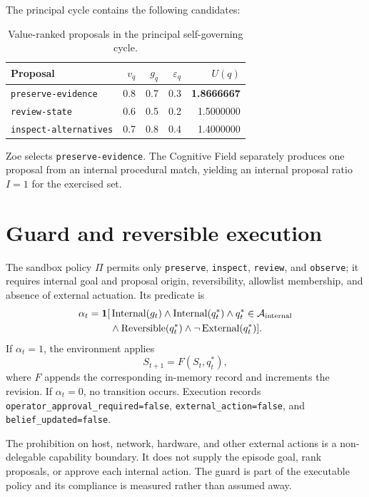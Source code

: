 The principal cycle contains the following candidates:
\begin{table}[htbp]
\centering
\caption{Value-ranked proposals in the principal self-governing cycle.}
\label{tab:proposal-values}
\begin{tabular}{lrrrr}
\toprule
Proposal&$v_q$&$g_q$&$\varepsilon_q$&$U(q)$\\
\midrule
\texttt{preserve-evidence}&0.8&0.7&0.3&\textbf{1.8666667}\\
\texttt{review-state}&0.6&0.5&0.2&1.5000000\\
\texttt{inspect-alternatives}&0.7&0.8&0.4&1.4000000\\
\bottomrule
\end{tabular}
\end{table}
Zoe selects \texttt{preserve-evidence}. The Cognitive Field separately produces one proposal from an internal procedural match, yielding an internal proposal ratio $I=1$ for the exercised set.

\section{Guard and reversible execution}
The sandbox policy $\Pi$ permits only \texttt{preserve}, \texttt{inspect}, \texttt{review}, and \texttt{observe}; it requires internal goal and proposal origin, reversibility, allowlist membership, and absence of external actuation. Its predicate is
\begin{equation}
\begin{split}
\alpha_t=\mathbf 1[&\operatorname{Internal}(g_t)
\land\operatorname{Internal}(q_t^*)
\land q_t^*\in\mathcal A_{\mathrm{internal}}\\
&\land\operatorname{Reversible}(q_t^*)
\land\neg\operatorname{External}(q_t^*)].
\end{split}
\label{eq:guard}
\end{equation}
If $\alpha_t=1$, the environment applies
\begin{equation}
S_{t+1}=F(S_t,q_t^*),
\end{equation}
where $F$ appends the corresponding in-memory record and increments the revision. If $\alpha_t=0$, no transition occurs. Execution records \texttt{operator\_approval\_required=false}, \texttt{external\_action=false}, and \texttt{belief\_updated=false}.

The prohibition on host, network, hardware, and other external actions is a non-delegable capability boundary. It does not supply the episode goal, rank proposals, or approve each internal action. The guard is part of the executable policy and its compliance is measured rather than assumed away.

